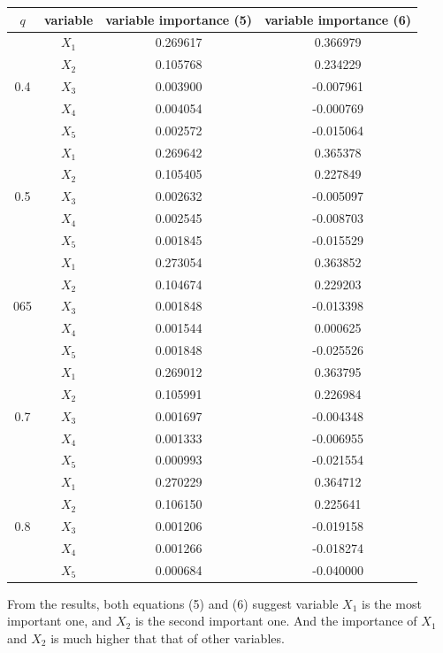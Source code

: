 \documentclass[paper=letter, fontsize=12pt]{article}
\begin{document}
\begin{enumerate}[label=(\alph*)]
\begin{enumerate}[label=(\roman*)]
		\begin{longtable}{|c|c|c|c|}
			\hline
			$q$ & variable & variable importance (5) & variable importance (6) \\ \hline
			\multirow{5}{1em}{0.4} & $X_1$ & 0.269617 & 0.366979 \\ 
			& $X_2$ & 0.105768 & 0.234229 \\
			& $X_3$ & 0.003900 & -0.007961\\
			& $X_4$ & 0.004054 & -0.000769 \\
			& $X_5$ & 0.002572 & -0.015064 \\
			\hline
			\multirow{5}{1em}{0.5} & $X_1$ & 0.269642 & 0.365378 \\ 
			& $X_2$ & 0.105405 & 0.227849 \\
			& $X_3$ & 0.002632 & -0.005097 \\
			& $X_4$ & 0.002545 & -0.008703 \\
			& $X_5$ & 0.001845 & -0.015529 \\
			\hline
			\multirow{5}{1em}{065} & $X_1$ & 0.273054 & 0.363852 \\ 
			& $X_2$ & 0.104674 & 0.229203 \\
			& $X_3$ & 0.001848 & -0.013398 \\
			& $X_4$ & 0.001544 & 0.000625 \\
			& $X_5$ & 0.001848 & -0.025526 \\
			\hline
			\multirow{5}{1em}{0.7} & $X_1$ & 0.269012 & 0.363795 \\ 
			& $X_2$ & 0.105991 & 0.226984 \\
			& $X_3$ & 0.001697 & -0.004348 \\
			& $X_4$ & 0.001333 & -0.006955 \\
			& $X_5$ & 0.000993 & -0.021554\\
			\hline
			\multirow{5}{1em}{0.8} & $X_1$ & 0.270229 & 0.364712 \\ 
			& $X_2$ & 0.106150 & 0.225641 \\
			& $X_3$ & 0.001206 & -0.019158 \\
			& $X_4$ & 0.001266 & -0.018274 \\
			& $X_5$ & 0.000684 & -0.040000 \\
			\hline
		\end{longtable}

		From the results, both equations (5) and (6) suggest variable $X_1$ is the most important one, and $X_2$ is the second important one. And the importance of $X_1$ and $X_2$ is much higher that that of other variables.
		

\end{enumerate}
\end{enumerate}
\end{document}
